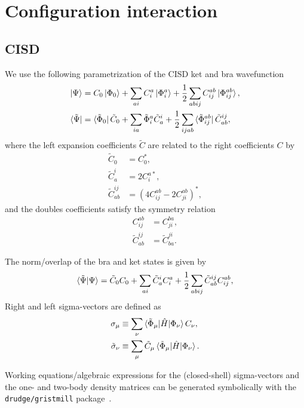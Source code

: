 \documentclass{article}
\begin{document}
\section{Configuration interaction}
\subsection{CISD}
We use the following parametrization of the CISD ket and bra wavefunction
\begin{align}
    \ket{\Psi} &= C_0 \ket{\Phi_0} + \sum_{ai} C^a_i \ket{\Phi^a_i} + \frac{1}{2} \sum_{abij} C^{ab}_{ij} \ket{\Phi^{ab}_{ij}}, \\ 
    \bra{\tilde{\Psi}} &= \bra{\tilde{\Phi}_0} \tilde{C}_0 + \sum_{ia} \tilde{\Phi}^a_i \tilde{C}^i_a + \frac{1}{2} \sum_{ijab} \bra{\tilde{\Phi}^{ab}_{ij}}\tilde{C}^{ij}_{ab}, 
\end{align}
where the left expansion coefficients $\tilde{C}$ are related to the right coefficients $C$ by
\begin{align}
    \tilde{C}_0 &= C_0^*, \\
    \tilde{C}^i_a &= 2 C^{a *}_i, \\
    \tilde{C}^{ij}_{ab} &= \left(4C^{ab}_{ij}-2C^{ab}_{ji} \right)^*,
\end{align}
and the doubles coefficients satisfy the symmetry relation
\begin{align}
    C^{ab}_{ij} &= C^{ba}_{ji}, \\
    \tilde{C}^{ij}_{ab} &= \tilde{C}^{ji}_{ba}.
\end{align}

The norm/overlap of the bra and ket states is given by
\begin{equation}
    \braket{\tilde{\Psi}|\Psi} = \tilde{C}_0 C_0 + \sum_{ai} \tilde{C}^i_a C^a_i + \frac{1}{2} \sum_{abij} \tilde{C}^{ij}_{ab} C^{ab}_{ij},
\end{equation}
Right and left sigma-vectors are defined as
\begin{align}
\sigma_\mu &\equiv \sum_\nu \braket{\tilde{\Phi}_\mu|\hat{H}|\Phi_\nu} C_\nu, \\ 
\tilde{\sigma}_\nu &\equiv \sum_\mu \tilde{C}_\mu \braket{\tilde{\Phi}_\mu|\hat{H}|\Phi_\nu}.
\end{align}

Working equations/algebraic expressions for the (closed-shell) sigma-vectors and the one- and two-body density matrices can be generated symbolically with the \texttt{drudge/gristmill} package~\cite{DrudgeCAS, Zhao2018Drudge}.
\end{document}
